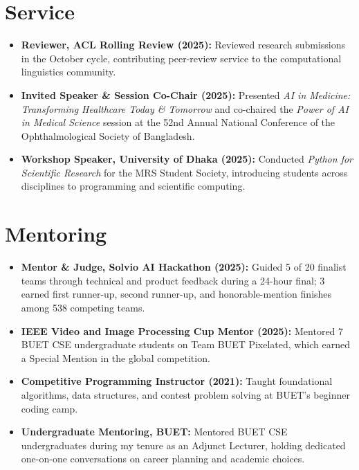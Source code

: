 \documentclass[10pt,letterpaper]{article}
\newenvironment{highlights}
    {\begin{itemize}[
        topsep=0.18em,
        parsep=0pt,
        partopsep=0pt,
        itemsep=0.42em,
        leftmargin=1.15em
    ]}
    {\end{itemize}}
\newenvironment{entry}
    {\begin{minipage}{\linewidth}\color{textColor}}
    {\end{minipage}}
\begin{document}
\section{Service}
\begin{entry}
\begin{highlights}
    \item \textbf{Reviewer, ACL Rolling Review (2025):} Reviewed research submissions in the October cycle, contributing peer-review service to the computational linguistics community.
    \item \textbf{Invited Speaker \& Session Co-Chair (2025):} Presented \textit{AI in Medicine: Transforming Healthcare Today \& Tomorrow} and co-chaired the \textit{Power of AI in Medical Science} session at the 52nd Annual National Conference of the Ophthalmological Society of Bangladesh.
    \item \textbf{Workshop Speaker, University of Dhaka (2025):} Conducted \textit{Python for Scientific Research} for the MRS Student Society, introducing students across disciplines to programming and scientific computing.
\end{highlights}
\end{entry}

\section{Mentoring}
\begin{entry}
\begin{highlights}
    \item \textbf{Mentor \& Judge, Solvio AI Hackathon (2025):} Guided 5 of 20 finalist teams through technical and product feedback during a 24-hour final; 3 earned first runner-up, second runner-up, and honorable-mention finishes among 538 competing teams.
    \item \textbf{IEEE Video and Image Processing Cup Mentor (2025):} Mentored 7 BUET CSE undergraduate students on Team BUET Pixelated, which earned a Special Mention in the global competition.
    \item \textbf{Competitive Programming Instructor (2021):} Taught foundational algorithms, data structures, and contest problem solving at BUET's beginner coding camp.
    \item \textbf{Undergraduate Mentoring, BUET:} Mentored BUET CSE undergraduates during my tenure as an Adjunct Lecturer, holding dedicated one-on-one conversations on career planning and academic choices.
\end{highlights}
\end{entry}
\vspace{-0.55em}
\end{document}
